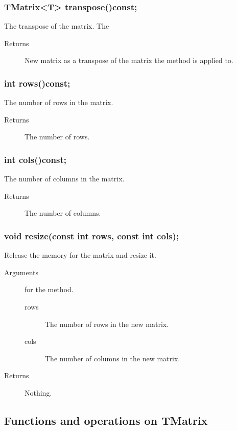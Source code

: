 \subsubsection{TMatrix<T> transpose()const;}
The transpose of the matrix. The 

\begin{description}
   \item[Returns] New matrix as a transpose of the matrix
                  the method is applied to.
\end{description}

\subsubsection{int rows()const;}
The number of rows in the matrix.

\begin{description}
   \item[Returns] The number of rows.
\end{description}

\subsubsection{int cols()const;}
The number of columns in the matrix.

\begin{description}
   \item[Returns] The number of columns.
\end{description}

\subsubsection{void resize(const int rows, const int cols);}
Release the memory for the matrix and resize it.
\begin{description}
   \item[Arguments] for the method.
     \begin{description}
       \item[rows] The number of rows in the new matrix.
       \item[cols] The number of columns in the new matrix.
     \end{description}
   \item[Returns] Nothing.
\end{description}

\subsection{Functions and operations on TMatrix}
